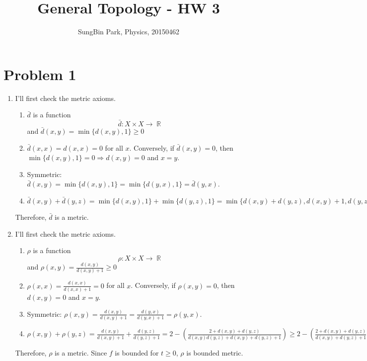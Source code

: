 \documentclass{article}
\DeclareMathOperator{\rr}{\mathbb{R}}
\begin{document}
\title{General Topology - HW 3}
\author{SungBin Park, Physics, 20150462} 

 \maketitle
\section*{Problem 1}
\begin{enumerate}
\item[A.] I'll first check the metric axioms.
\begin{enumerate}
\item $\bar{d}$ is a function
\begin{equation*}
\bar{d}:X\times X\longrightarrow \rr
\end{equation*}
and $\bar{d}(x,y)=\min\{d(x,y), 1\}\geq 0$
\item $\bar{d}(x,x)=d(x, x)=0$ for all $x$. Conversely, if $\bar{d}(x,y)=0$, then $\min\{d(x,y), 1\}=0\Rightarrow d(x,y)=0$ and $x=y$.
\item Symmetric: $\bar{d}(x,y)=\min\{d(x,y), 1\}=\min\{d(y,x), 1\}=\bar{d}(y,x)$.
\item $\bar{d}(x,y)+\bar{d}(y,z)=\min\{d(x,y), 1\}+\min\{d(y,z), 1\}= \min\{d(x,y)+d(y,z), d(x,y)+1, d(y,z)+1, 2\}\geq \min\{d(x,y)+d(y,z), 1\}\geq \min\{d(x,z), 1\}=\bar{d}(x,z)$
\end{enumerate}
Therefore, $\bar{d}$ is a metric.
\item[B.] I'll first check the metric axioms.
\begin{enumerate}
\item $\rho$ is a function
\begin{equation*}
\rho:X\times X\longrightarrow \rr
\end{equation*}
and $\rho(x,y)=\frac{d(x, y)}{d(x,y)+1}\geq 0$
\item $\rho(x,x)=\frac{d(x, x)}{d(x,x)+1}=0$ for all $x$. Conversely, if $\rho(x,y)=0$, then $d(x,y)=0$ and $x=y$.
\item Symmetric: $\rho(x,y)=\frac{d(x,y)}{d(x,y)+1}=\frac{d(y,x)}{d(y,x)+1}=\rho(y,x)$.
\item $\rho(x,y)+\rho(y,z)=\frac{d(x, y)}{d(x,y)+1}+\frac{d(y, z)}{d(y,z)+1}=2- \left(\frac{2+d(x, y)+d(y, z)}{d(x,y)d(y,z)+d(x,y)+d(y,z)+1}\right)\geq 2- \left(\frac{2+d(x, y)+d(y, z)}{d(x,y)+d(y,z)+1}\right)=2- \left(1+\frac{1}{d(x,y)+d(y,z)+1}\right)\geq 2- \left(1+\frac{1}{d(x,z)+1}\right)=\rho(x,z)$
\end{enumerate}
Therefore, $\rho$ is a metric. Since $f$ is bounded for $t\geq 0$, $\rho$ is bounded metric.
\end{enumerate}
\end{document}
